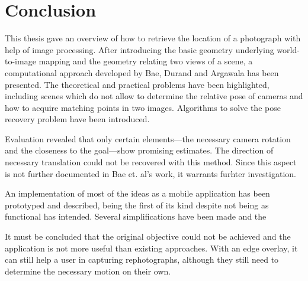 \chapter{Conclusion}

This thesis gave an overview of how to retrieve the location of a photograph
with help of image processing. After introducing the basic geometry underlying
world-to-image mapping and the geometry relating two views of a scene, a
computational approach developed by Bae, Durand and Argawala has been presented.
The theoretical and practical problems have been
highlighted, including scenes which do not allow to determine the relative pose
of cameras and how to acquire matching points in two images. Algorithms to solve
the pose recovery problem have been introduced.

Evaluation revealed that only certain elements---the necessary
camera rotation and the closeness to the goal---show promising estimates. The
direction of necessary translation could not be recovered with this method.
Since this aspect is not further documented in Bae et. al's work, it warrants
furhter investigation.

An implementation of most of the ideas as a mobile application has been prototyped and
described, being the first of its kind despite not being as functional has
intended. Several simplifications have been made and the 

It must be concluded that the original objective could not be achieved and
the application is not more useful than existing approaches. With an edge
overlay, it can still help a user in capturing rephotographs, although they
still need to determine the necessary motion on their own.

